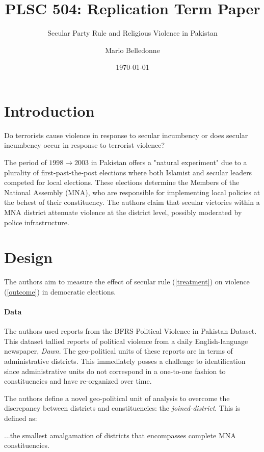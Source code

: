 \documentclass{scrartcl}
\title{PLSC 504: Replication Term Paper}
\subtitle{Secular Party Rule and Religious Violence in Pakistan}
\author{Mario Belledonne}
\date{\today}
\begin{document}
\maketitle

\section{Introduction}

Do terrorists cause violence in response to secular incumbency or does secular incumbency occur in response to terrorist violence?

The period of $1998 \rightarrow 2003$ in Pakistan offers a "natural experiment" due to a plurality of first-past-the-post elections where both Islamist and secular leaders competed for local elections.
These elections determine the Members of the National Assembly (MNA), who are responsible for implementing local policies at the behest of their constituency.
The authors claim that secular victories within a MNA district attenuate violence at the district level, possibly moderated by police infrastructure. 

\section{Design} \label{design}


The authors aim to measure the effect of secular rule (\ref{treatment}) on violence (\ref{outcome}) in democratic elections.

\paragraph{Data} \label{data}

The authors used reports from the BFRS Political Violence in Pakistan Dataset. This dataset tallied reports of political violence from a daily English-language newspaper, \textit{Dawn}. The geo-political units of these reports are in terms of administrative districts. This immediately posses a challenge to identification since administrative units do not correspond in a one-to-one fashion to constituencies and have re-organized over time.

The authors define a novel geo-political unit of analysis to overcome the discrepancy between districts and constituencies: the \textit{joined-district}. 
This is defined as:
\begin{displayquote}
  ...the smallest amalgamation of districts that encompasses complete MNA constituencies. 
\end{displayquote}
\end{document}
